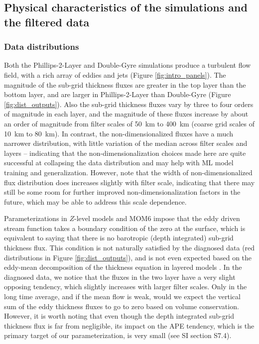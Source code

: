 \documentclass[draft]{agujournal2019}
\begin{document}
\subsection{Physical characteristics of the simulations and the filtered data}
\subsubsection{Data distributions}
Both the Phillips-2-Layer and Double-Gyre simulations produce a turbulent flow field, with a rich array of eddies and jets (Figure \ref{fig:intro_panels}).
The magnitude of the sub-grid thickness fluxes are greater in the top layer than the bottom layer, and are larger in Phillips-2-Layer than Double-Gyre (Figure \ref{fig:dist_outputs}). Also the sub-grid thickness fluxes vary by three to four orders of magnitude in each layer, and the magnitude of these fluxes increase by about an order of magnitude from filter scales of 50~km to 400~km (coarse grid scales of 10~km to 80~km). 
In contrast, the non-dimensionalized fluxes have a much narrower distribution, with little variation of the median across filter scales and layers -- indicating that the non-dimensionalization choices made here are quite successful at collapsing the data distribution and may help with ML model training and generalization. However, note that the width of non-dimensionalized flux distribution does increases slightly with filter scale, indicating that there may still be some room for further improved non-dimensionalization factors in the future, which may be able to address this scale dependence. 

Parameterizations in $Z$-level models and MOM6 impose that the eddy driven stream function takes a boundary condition of the zero at the surface, which is equivalent to saying that there is no barotropic (depth integrated) sub-grid thickness flux. This condition is not naturally satisfied by the diagnosed data (red distributions in Figure \ref{fig:dist_outputs}), and is not even expected based on the eddy-mean decomposition of the thickness equation in layered models \cite{killworth2001boundary}. In the diagnosed data, we notice that the fluxes in the two layer have a very slight opposing tendency, which slightly increases with larger filter scales. Only in the long time average, and if the mean flow is weak, would we expect the vertical sum of the eddy thickness fluxes to go to zero based on volume conservation. However, it is worth noting that even though the depth integrated sub-grid thickness flux is far from negligible, its impact on the APE tendency, which is the primary target of our parameterization, is very small (see SI section S7.4).
\end{document}
